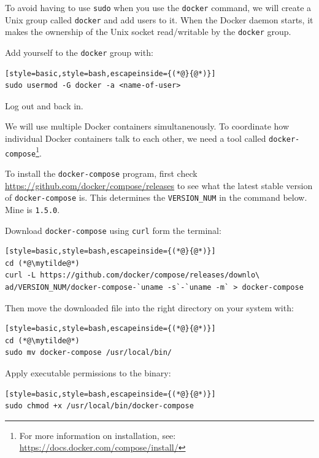 \documentclass[12pt, a4paper, twoside, openany, titlepage]{book}
\begin{document}
To avoid having to use \texttt{sudo} when you use the \texttt{docker} command, we will create a Unix group called \texttt{docker} and add users to it. When the Docker daemon starts, it makes the ownership of the Unix socket read/writable by the \texttt{docker} group.

Add yourself to the \texttt{docker} group with:
\begin{lstlisting}[style=basic,style=bash,escapeinside={(*@}{@*)}]
sudo usermod -G docker -a <name-of-user>
\end{lstlisting}
Log out and back in.

We will use multiple Docker containers simultanenously. To coordinate how individual Docker containers talk to each other, we need a tool called \texttt{docker-compose}\footnote{For more information on installation, see: \url{https://docs.docker.com/compose/install/}}.
%

To install the \texttt{docker-compose} program, first check \url{https://github.com/docker/compose/releases} to see what the latest stable version of \texttt{docker-compose} is. This determines the \texttt{VERSION\_NUM} in the command below. Mine is \texttt{1.5.0}.

Download \texttt{docker-compose} using \texttt{curl} form the terminal:
\begin{lstlisting}[style=basic,style=bash,escapeinside={(*@}{@*)}]
cd (*@\mytilde@*)
curl -L https://github.com/docker/compose/releases/downlo\
ad/VERSION_NUM/docker-compose-`uname -s`-`uname -m` > docker-compose
\end{lstlisting}

Then move the downloaded file into the right directory on your system with:
\begin{lstlisting}[style=basic,style=bash,escapeinside={(*@}{@*)}]
cd (*@\mytilde@*)
sudo mv docker-compose /usr/local/bin/
\end{lstlisting}

Apply executable permissions to the binary:
\begin{lstlisting}[style=basic,style=bash,escapeinside={(*@}{@*)}]
sudo chmod +x /usr/local/bin/docker-compose
\end{lstlisting}
\end{document}
